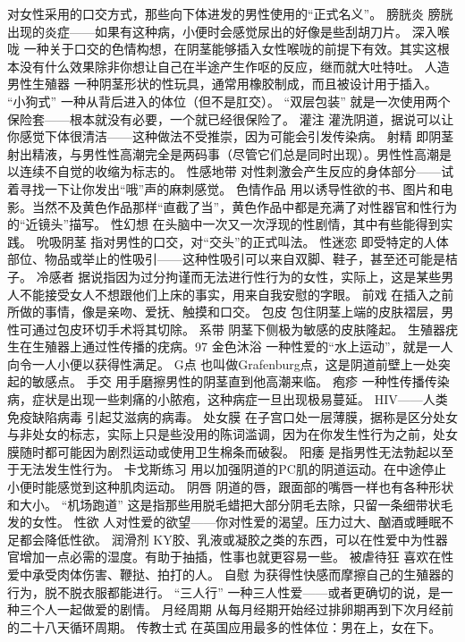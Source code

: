 \documentclass[12pt,UTF8]{ctexbook}
\begin{document}
对女性采用的口交方式，那些向下体进发的男性使用的“正式名义”。
膀胱炎
膀胱出现的炎症——如果有这种病，小便时会感觉尿出的好像是些刮胡刀片。
深入喉咙
一种关于口交的色情构想，在阴茎能够插入女性喉咙的前提下有效。其实这根本没有什么效果除非你想让自己在半途产生作呕的反应，继而就大吐特吐。
人造男性生殖器
一种阴茎形状的性玩具，通常用橡胶制成，而且被设计用于插入。
“小狗式”
一种从背后进入的体位（但不是肛交）。
“双层包装”
就是一次使用两个保险套——根本就没有必要，一个就已经很保险了。
灌注
灌洗阴道，据说可以让你感觉下体很清洁——这种做法不受推崇，因为可能会引发传染病。
射精
即阴茎射出精液，与男性性高潮完全是两码事（尽管它们总是同时出现）。男性性高潮是以连续不自觉的收缩为标志的。
性感地带
对性刺激会产生反应的身体部分——试着寻找一下让你发出“哦”声的麻刺感觉。
色情作品
用以诱导性欲的书、图片和电影。当然不及黄色作品那样“直截了当”，黄色作品中都是充满了对性器官和性行为的“近镜头”描写。
性幻想
在头脑中一次又一次浮现的性剧情，其中有些能得到实践。
吮吸阴茎
指对男性的口交，对“交头”的正式叫法。
性迷恋
即受特定的人体部位、物品或举止的性吸引——这种性吸引可以来自双脚、鞋子，甚至还可能是桔子。
冷感者
据说指因为过分拘谨而无法进行性行为的女性，实际上，这是某些男人不能接受女人不想跟他们上床的事实，用来自我安慰的字眼。
前戏
在插入之前所做的事情，像是亲吻、爱抚、触摸和口交。
包皮
包住阴茎上端的皮肤褶层，男性可通过包皮环切手术将其切除。
系带
阴茎下侧极为敏感的皮肤隆起。
生殖器疣
生在生殖器上通过性传播的疣病。97%
金色沐浴
一种性爱的“水上运动”，就是一人向令一人小便以获得性满足。
G点
也叫做Grafenburg点，这是阴道前壁上一处突起的敏感点。
手交
用手磨擦男性的阴茎直到他高潮来临。
疱疹
一种性传播传染病，症状是出现一些刺痛的小脓疱，这种病症一旦出现极易蔓延。
HIV——人类免疫缺陷病毒
引起艾滋病的病毒。
处女膜
在子宫口处一层薄膜，据称是区分处女与非处女的标志，实际上只是些没用的陈词滥调，因为在你发生性行为之前，处女膜随时都可能因为剧烈运动或使用卫生棉条而破裂。
阳痿
是指男性无法勃起以至于无法发生性行为。
卡戈斯练习
用以加强阴道的PC肌的阴道运动。在中途停止小便时能感觉到这种肌肉运动。
阴唇
阴道的唇，跟面部的嘴唇一样也有各种形状和大小。
“机场跑道”
这是指那些用脱毛蜡把大部分阴毛去除，只留一条细带状毛发的女性。
性欲
人对性爱的欲望——你对性爱的渴望。压力过大、酗酒或睡眠不足都会降低性欲。
润滑剂
KY胶、乳液或凝胶之类的东西，可以在性爱中为性器官增加一点必需的湿度。有助于抽插，性事也就更容易一些。
被虐待狂
喜欢在性爱中承受肉体伤害、鞭挞、拍打的人。
自慰
为获得性快感而摩擦自己的生殖器的行为，脱不脱衣服都能进行。
“三人行”
一种三人性爱——或者更确切的说，是一种三个人一起做爱的剧情。
月经周期
从每月经期开始经过排卵期再到下次月经前的二十八天循环周期。
传教士式
在英国应用最多的性体位：男在上，女在下。
\end{document}
